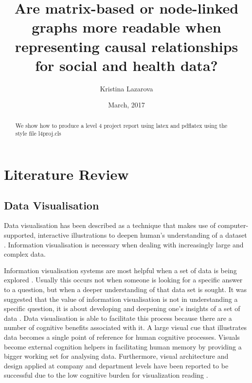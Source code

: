 \documentclass{l4proj}
\begin{document}
\title{Are matrix-based or node-linked graphs more readable when representing causal relationships for social and health data?}
\author{Kristina Lazarova}
\date{March, 2017}
\maketitle

\begin{abstract}
We show how to produce a level 4 project report using latex and pdflatex using the 
style file l4proj.cls
\end{abstract}

\educationalconsent
%
%
\tableofcontents
\chapter{Literature Review}

\section{Data Visualisation}

Data visualisation has been described as a technique that makes use of computer-supported, interactive illustrations to deepen human's understanding of a dataset \cite{card1999readings}. Information visualisation is necessary when dealing with increasingly large and complex data.

Information visualisation systems are most helpful when a set of data is being explored \cite{fekete2008value}. Usually this occurs not when someone is looking for a specific answer to a question, but when a deeper understanding of that data set is sought. It was suggested that the value of information visualisation is not in understanding a specific question, it is about developing and deepening one's insights of a set of data \cite{fekete2008value}. Data visualisation is able to facilitate this process because there are a number of cognitive benefits associated with it. A large visual cue that illustrates data becomes a single point of reference for human cognitive processes. Visuals become external cognition helpers in facilitating human memory by providing a bigger working set for analysing data. Furthermore, visual architecture and design applied at company and department levels have been reported to be successful due to the low cognitive burden for visualization reading \cite{king2016cognitive}.
\end{document}
